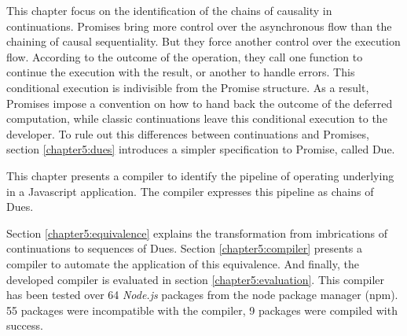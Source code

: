 This chapter focus on the identification of the chains of causality in continuations.
Promises bring more control over the asynchronous flow than the chaining of causal sequentiality.
But they force another control over the execution flow.
According to the outcome of the operation, they call one function to continue the execution with the result, or another to handle errors.
This conditional execution is indivisible from the Promise structure.
As a result, Promises impose a convention on how to hand back the outcome of the deferred computation, while classic continuations leave this conditional execution to the developer.
To rule out this differences between continuations and Promises, section \ref{chapter5:dues} introduces a simpler specification to Promise, called Due.

This chapter presents a compiler to identify the pipeline of operating underlying in a Javascript application. %
The compiler expresses this pipeline as chains of Dues.

Section \ref{chapter5:equivalence} explains the transformation from imbrications of continuations to sequences of Dues.
Section \ref{chapter5:compiler} presents a compiler to automate the application of this equivalence.
And finally, the developed compiler is evaluated in section \ref{chapter5:evaluation}.
This compiler has been tested over 64 \textit{Node.js} packages from the node package manager (npm).
55 packages were incompatible with the compiler, 9 packages were compiled with success.




